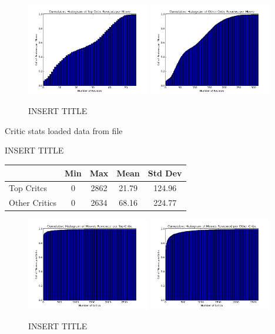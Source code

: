 \documentclass[12pt]{article}
\begin{document}
\begin{figure}[H]
    \centering
    \includegraphics[width=0.48\textwidth]{plots/plot_r_mov_top.png}
    \includegraphics[width=0.48\textwidth]{plots/plot_r_mov_oth.png}
    \caption{INSERT TITLE}
    \label{fig:r_mov}
\end{figure}


Critic stats
loaded data from file
\begin{table}[H]
 \centering
 INSERT TITLE \\
 \begin{tabular}{| l | c | c | c | c |}
 \hline
 &  Min & Max & Mean & Std Dev  \\
 \hline
 Top Critcs & 0 & 2862 & 21.79 & 124.96 \\
 Other Critics & 0 & 2634 & 68.16 & 224.77 \\
 \hline
 \end{tabular}
 \end{table}

\begin{figure}[H]
    \centering
    \includegraphics[width=0.48\textwidth]{plots/plot_r_crit_top.png}
    \includegraphics[width=0.48\textwidth]{plots/plot_r_crit_oth.png}
    \caption{INSERT TITLE}
    \label{fig:r_crit}
\end{figure}
\end{document}

